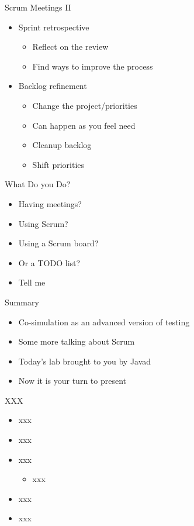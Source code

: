 \begin{frame}[fragile]{Scrum Meetings II}
\begin{itemize}
\item Sprint retrospective
\begin{itemize}
\item Reflect on the review
\item Find ways to improve the process
\end{itemize}
\item Backlog refinement
\begin{itemize}
\item Change the project/priorities
\item Can happen as you feel need
\item Cleanup backlog
\item Shift priorities
\end{itemize}
\end{itemize}
\end{frame}

\begin{frame}[fragile]{What Do you Do?}
\begin{itemize}
\item Having meetings?
\item Using Scrum?
\item Using a Scrum board?
\item Or a TODO list?
\item Tell me
\end{itemize}
\end{frame}


\begin{frame}[fragile]{Summary}
\begin{itemize}
\item Co-simulation as an advanced version of testing
\item Some more talking about Scrum
\item Today's lab brought to you by Javad
\item Now it is your turn to present
\end{itemize}
\end{frame}




\begin{frame}[fragile]{XXX}
\begin{itemize}
\item xxx
\item xxx
\item xxx
\begin{itemize}
\item xxx
\end{itemize}
\item xxx
\item xxx
\end{itemize}
\end{frame}
